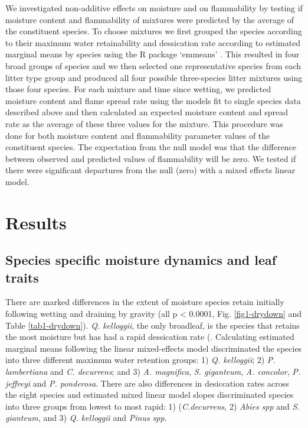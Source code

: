 \documentclass[fire,article,submit,moreauthors,pdftex]{Definitions/mdpi}
\begin{document}
We investigated non-additive effects on moisture and on flammability by testing if moisture content and flammability of mixtures were predicted by the average of the constituent species. To choose mixtures we first grouped the species according to their maximum water retainability and dessication rate according to estimated marginal means by species using the R package `emmeans' \cite{Lenth-2019}. This resulted in four broad groups of species and we then selected one representative species from each litter type group and produced all four possible three-species litter mixtures using those four species. For each mixture and time since wetting, we predicted moisture content and flame spread rate using the models fit to single species data described above and then calculated an expected moisture content and spread rate as the average of these three values for the mixture. This procedure was done for both moisture content and flammability parameter values of the constituent species. The expectation from the null model was that the difference between observed and predicted values of flammability will be zero. We tested if there were significant departures from the null (zero) with a mixed effects linear model.


\section{Results}

\subsection{Species specific moisture dynamics and leaf traits}

There are marked differences in the extent of moisture species retain initially following wetting and draining by gravity (all p < 0.0001, Fig. \ref{fig1-drydown} and Table \ref{tab1-drydown}). \emph{Q. kelloggii}, the only broadleaf, is the species that retains the most moisture but has had a rapid dessication rate (. Calculating estimated marginal means following the linear mixed-effects model discriminated the species into three different maximum water retention groups: 1) \emph{Q. kelloggii}; 2) \emph{P. lambertiana} and \emph{C. decurrens}; and 3) \emph{A. magnifica}, \emph{S. giganteum}, \emph{A. concolor}, \emph{P. jeffreyi} and \emph{P. ponderosa}.  There are also differences in desiccation rates across the eight species and estimated mixed linear model slopes discriminated species into three groups from lowest to most rapid: 1) (\emph{C.decurrens}, 2) \emph{Abies spp} and \emph{S. gianteum}, and 3) \emph{Q. kelloggii} and \emph{Pinus spp}.
\end{document}
